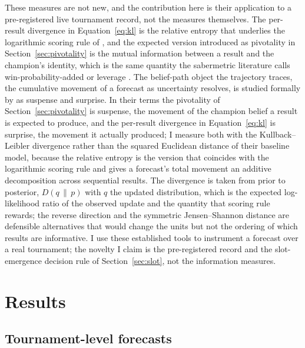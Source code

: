 \documentclass[11pt,letterpaper]{article}
\begin{document}
These measures are not new, and the contribution here is their application to a pre-registered live tournament record, not the measures themselves. The per-result divergence in Equation~\eqref{eq:kl} is the relative entropy that underlies the logarithmic scoring rule of \citet{gneiting2007}, and the expected version introduced as pivotality in Section~\ref{sec:pivotality} is the mutual information between a result and the champion's identity, which is the same quantity the sabermetric literature calls win-probability-added or leverage \citep{tango2007}. The belief-path object the trajectory traces, the cumulative movement of a forecast as uncertainty resolves, is studied formally by \citet{ely2015} as suspense and surprise. In their terms the pivotality of Section~\ref{sec:pivotality} is suspense, the movement of the champion belief a result is expected to produce, and the per-result divergence in Equation~\eqref{eq:kl} is surprise, the movement it actually produced; I measure both with the Kullback--Leibler divergence rather than the squared Euclidean distance of their baseline model, because the relative entropy is the version that coincides with the logarithmic scoring rule and gives a forecast's total movement an additive decomposition across sequential results. The divergence is taken from prior to posterior, $D(q \,\|\, p)$ with $q$ the updated distribution, which is the expected log-likelihood ratio of the observed update and the quantity that scoring rule rewards; the reverse direction and the symmetric Jensen--Shannon distance are defensible alternatives that would change the units but not the ordering of which results are informative. I use these established tools to instrument a forecast over a real tournament; the novelty I claim is the pre-registered record and the slot-emergence decision rule of Section~\ref{sec:slot}, not the information measures.

\section{Results}

\subsection{Tournament-level forecasts}
\end{document}

